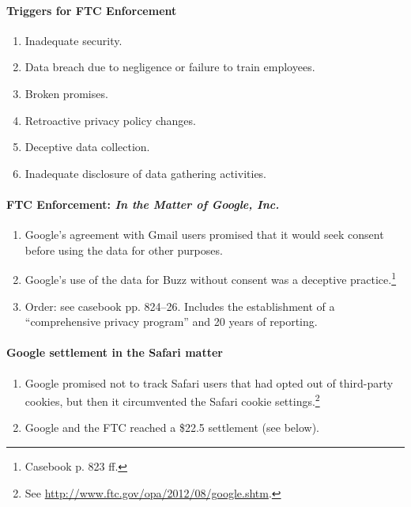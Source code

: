\paragraph{Triggers for FTC Enforcement}

\begin{enumerate}
    \item Inadequate security.
    \item Data breach due to negligence or failure to train employees.
    \item Broken promises.
    \item Retroactive privacy policy changes.
    \item Deceptive data collection.
    \item Inadequate disclosure of data gathering activities.
\end{enumerate}

\paragraph{FTC Enforcement: \emph{In the Matter of Google, Inc.}}

\begin{enumerate}
    \item Google's agreement with Gmail users promised that it would seek 
    consent before using the data for other purposes.
    \item Google's use of the data for Buzz without consent was a deceptive 
    practice.\footnote{Casebook p. 823 ff.}
    \item Order: see casebook pp. 824--26. Includes the establishment of a 
    ``comprehensive privacy program'' and 20 years of reporting.
\end{enumerate}

\paragraph{Google settlement in the Safari matter}

\begin{enumerate}
    \item Google promised not to track Safari users that had opted out of 
    third-party cookies, but then it circumvented the Safari cookie 
    settings.\footnote{See \url{http://www.ftc.gov/opa/2012/08/google.shtm}.}
    \item Google and the FTC reached a \$22.5 settlement (see below).
\end{enumerate}

